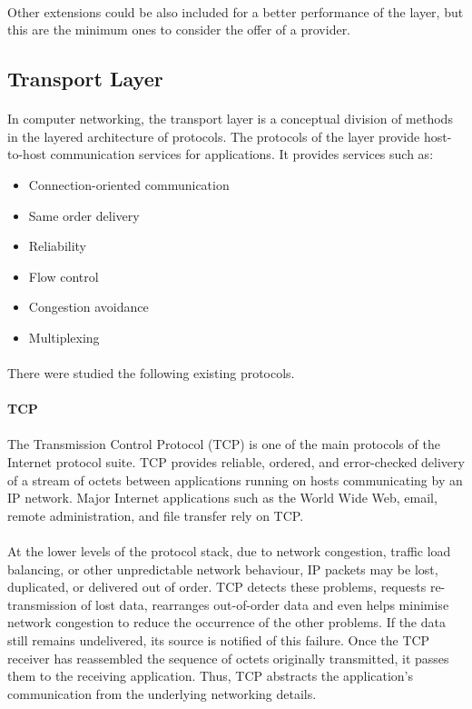 \paragraph{}
Other extensions could be also included for a better performance of the layer, but this are the minimum ones to consider the offer of a provider.

\subsection{Transport Layer}
\paragraph{}
In computer networking, the transport layer is a conceptual division of methods in the layered architecture of protocols.  The protocols of the layer provide host-to-host communication services for applications. It provides services such as:
\begin{itemize}
\item Connection-oriented communication
\item Same order delivery
\item Reliability
\item Flow control
\item Congestion avoidance
\item Multiplexing
\end{itemize}
\paragraph{}
There were studied the following existing protocols.

\paragraph{} \textbf{TCP}
\paragraph{}
The Transmission Control Protocol (TCP) is one of the main protocols of the Internet protocol suite. TCP provides reliable, ordered, and error-checked delivery of a stream of octets between applications running on hosts communicating by an IP network. Major Internet applications such as the World Wide Web, email, remote administration, and file transfer rely on TCP.
\paragraph{}
At the lower levels of the protocol stack, due to network congestion, traffic load balancing, or other unpredictable network behaviour, IP packets may be lost, duplicated, or delivered out of order. TCP detects these problems, requests re-transmission of lost data, rearranges out-of-order data and even helps minimise network congestion to reduce the occurrence of the other problems. If the data still remains undelivered, its source is notified of this failure. Once the TCP receiver has reassembled the sequence of octets originally transmitted, it passes them to the receiving application. Thus, TCP abstracts the application's communication from the underlying networking details.
